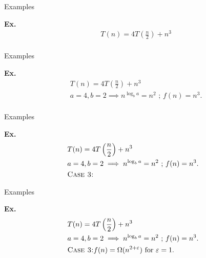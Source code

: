 \documentclass{beamer}
\begin{document}
\begin{frame}{Examples}
    \begin{exampleblock}{\textbf{Ex.}}
        \vspace{-8mm}
        \begin{align*}
            & T(n) = 4T\left(\frac{n}{2} \right) + n^3 \\
        \end{align*}
    \end{exampleblock}
\end{frame}

\begin{frame}{Examples}
    \begin{exampleblock}{\textbf{Ex.}}
        \vspace{-8mm}
        \begin{align*}
            & T(n) = 4T\left(\frac{n}{2} \right) + n^3 \\
            & a = 4, b = 2 \implies n^{\log_b a} = n^2 \text{ ; } f(n) = n^3 \text{.} \\
        \end{align*}
    \end{exampleblock}
\end{frame}

\begin{frame}{Examples}
    \begin{exampleblock}{\textbf{Ex.}}
        \vspace{-8mm}
        \begin{align*}
            & T(n) = 4T\left(\frac{n}{2} \right) + n^3 \\
            & a = 4, b = 2 \implies n^{\log_b a} = n^2 \text{ ; } f(n) = n^3 \text{.} \\
            & \text{\textsc{Case 3:}} \\
        \end{align*}
    \end{exampleblock}
\end{frame}

\begin{frame}{Examples}
    \begin{exampleblock}{\textbf{Ex.}}
        \vspace{-8mm}
        \begin{align*}
            & T(n) = 4T\left(\frac{n}{2} \right) + n^3 \\
            & a = 4, b = 2 \implies n^{\log_b a} = n^2 \text{ ; } f(n) = n^3 \text{.} \\
            & \text{\textsc{Case 3:}} f(n) = \Omega(n^{2 + \varepsilon}) \text{ for } \varepsilon = 1 \text{.} \\
        \end{align*}
    \end{exampleblock}
\end{frame}
\end{document}
